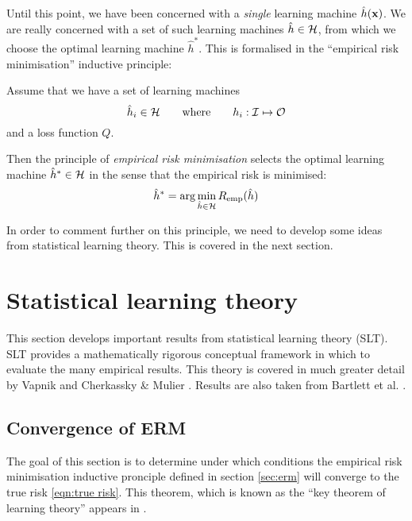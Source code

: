 Until this point, we have been concerned with a \emph{single} learning
machine $\hat{h}(\mathbf{x})$.  We are really concerned with a set of such
learning machines $\hat{h} \in \mathcal{H}$, from which we choose the
optimal learning machine $\hat{h}^{\ast}$.  This is
formalised in the ``empirical risk minimisation'' inductive principle:

Assume that we have a set of learning machines
%
\begin{equation}
\hat{h}_i \in \mathcal{H} \qquad \mbox{where} \qquad h_i : \mathcal{I} \mapsto
\mathcal{O}
\end{equation}
%
and a loss function $Q$.

Then the principle of \emph{empirical risk minimisation} selects the
optimal learning machine $\hat{h}^{\ast} \in \mathcal{H}$ in the sense that
the empirical risk is minimised:
%
\begin{equation}
\hat{h}^{\ast} = \arg \min_{\hat{h} \in \mathcal{H}} R_{\mathrm{emp}}(\hat{h})
\label{eqn:erm}
\end{equation}

In order to comment further on this principle, we need to develop some
ideas from statistical learning theory.  This is covered in the next
section.






\section{Statistical learning theory}
\label{sec:slt}

This section develops important results from statistical learning
theory (SLT).  SLT provides a mathematically rigorous
conceptual framework in which to evaluate the many empirical results.
This theory is covered in much greater detail by Vapnik
\cite{Vapnik98} and Cherkassky \& Mulier \cite{Cherkassky98}.  Results
are also taken from Bartlett et al. \cite{Bartlett98a}.


\subsection{Convergence of ERM}

The goal of this section is to determine under which conditions the
empirical risk minimisation inductive pronciple defined in section
\ref{sec:erm} will converge to the true risk \ref{eqn:true risk}.
This theorem, which is known as the ``key theorem of learning theory''
appears in \cite{Cherkassky98}.

